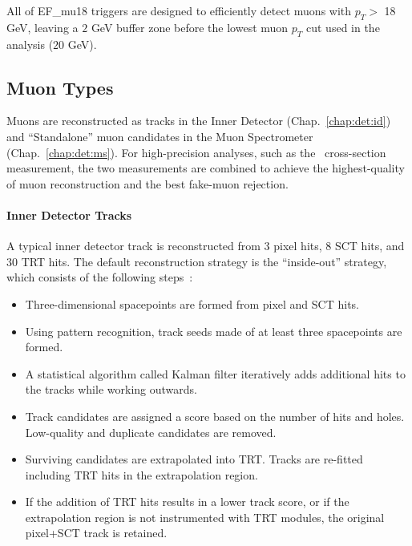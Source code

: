 All of EF\_mu18 triggers are designed to efficiently detect muons with $p_T >$ 18 GeV, leaving a $2$ GeV buffer zone before the lowest muon $p_T$ cut used in the analysis ($20$ GeV).



\subsection{Muon Types}
Muons are reconstructed as tracks in the Inner Detector (Chap.~\ref{chap:det:id}) and ``Standalone'' muon candidates in the Muon Spectrometer (Chap.~\ref{chap:det:ms}). For high-precision analyses, such as the \Wmn\ cross-section measurement, the two measurements are combined to achieve the highest-quality of muon reconstruction and the best fake-muon rejection.

\paragraph{Inner Detector Tracks}
A typical inner detector track is reconstructed from 3 pixel hits, 8 SCT hits, and 30 TRT hits. The default reconstruction strategy is the ``inside-out'' strategy, which consists of the following steps~\cite{ATLAS-CONF-2012-042}:
\begin{itemize}
\item Three-dimensional spacepoints are formed from pixel and SCT hits.
\item Using pattern recognition, track seeds made of at least three spacepoints are formed.
\item A statistical algorithm called Kalman filter iteratively adds additional hits to the tracks while working outwards.
\item Track candidates are assigned a score based on the number of hits and holes. Low-quality and duplicate candidates are removed.
\item Surviving candidates are extrapolated into TRT. Tracks are re-fitted including TRT hits in the extrapolation region.
\item If the addition of TRT hits results in a lower track score, or if the extrapolation region is not instrumented with TRT modules, the original pixel+SCT track is retained.
\end{itemize}

